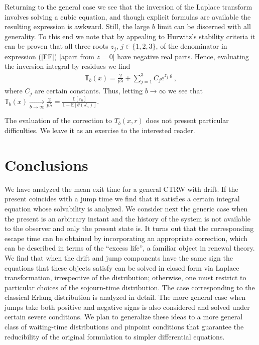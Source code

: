 \documentclass[english,aps,a4paper,twocolumn,showpacs,showkeys,amsfonts,amsmath,amssymb,amscd,nofootinbib]{revtex4}
\newcommand{\1}{\'\i}
\newcommand{\EE}{\mathbb{E}}
\newcommand{\TT}{\mathbb{T}}\newcommand{\FF}{\mathbb{F}}
\begin{document}
Returning to the general case we see that
   the inversion of the
Laplace transform involves solving a  cubic
 equation, and though explicit formulas are available the resulting expression is
 awkward.  Still, the    large  $b$ limit
can be discerned with all generality.  To this end we note that by
appealing to Hurwitz's stability criteria it can be proven that
all three roots $z_j$, $j\in\{1,2,3\}$, of the denominator  in  expression
(\ref{FF}) |apart from $z=0$|  have negative real parts.  Hence,
evaluating the inversion integral by residues  we find
  \begin{eqnarray}
 \TT_b(x)=\frac{2}{ p\lambda}  + \sum_{j=1}^3C_j
 e^{z_j\varrho},
\end{eqnarray}
where $C_j$ are certain constants. Thus, letting $b\to\infty$ we
see that $\TT_b(x) \underset{b \to\infty}\to  \frac{2 }{ p\lambda} =\frac{\EE[\tau_n]}{1-\EE[\theta(J_n)]}$.

The evaluation of the correction to $T_b(x,r)$ does not present
particular difficulties. We leave it as an exercise to the
interested reader.

\section{Conclusions}

    We have analyzed the   mean exit time  for  a
general CTRW with drift. If the present  coincides with   a jump time we find that it  satisfies a
   certain integral equation whose solvability is analyzed. We consider next the generic  case when  the present is an
arbitrary instant and
the      history of the system is not available to the observer and only the present state is.
It turns out that the corresponding escape time can be obtained by incorporating an appropriate correction, which    can be described
in terms of the ``excess life'', a familiar object in renewal
theory.  We
   find that when the  drift and jump  components have  the same sign the equations that these objects satisfy  can be solved  in closed form
   via Laplace transformation, irrespective of the  distribution;
   otherwise, one must restrict to particular choices of the
sojourn-time distribution. The case   corresponding to the
classical Erlang distribution is analyzed in detail.    The more general case when jumps take both positive and negative signs is
also considered and solved under certain severe conditions.   We plan to generalize these ideas to a
more general class of waiting-time distributions  and   pinpoint
conditions that guarantee the  reducibility of the original formulation to simpler differential
equations.
\end{document}
